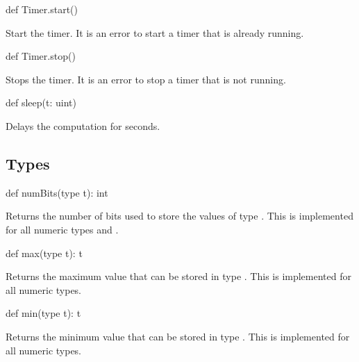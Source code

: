 \begin{protohead}
def Timer.start()
\end{protohead}
\begin{protobody}
Start the timer.  It is an error to start a timer that is already
running.
\end{protobody}

\begin{protohead}
def Timer.stop()
\end{protohead}
\begin{protobody}
Stops the timer.  It is an error to stop a timer that is not running.
\end{protobody}

\begin{protohead}
def sleep(t: uint)
\end{protohead}
\begin{protobody}
Delays the computation for  seconds.
\end{protobody}

\subsection{Types}

\begin{protohead}
def numBits(type t): int
\end{protohead}
\begin{protobody}
Returns the number of bits used to store the values of type .
This is implemented for all numeric types and .
\end{protobody}

\begin{protohead}
def max(type t): t
\end{protohead}
\begin{protobody}
Returns the maximum value that can be stored in type .  This
is implemented for all numeric types.
\end{protobody}

\begin{protohead}
def min(type t): t
\end{protohead}
\begin{protobody}
Returns the minimum value that can be stored in type .  This
is implemented for all numeric types.
\end{protobody}


